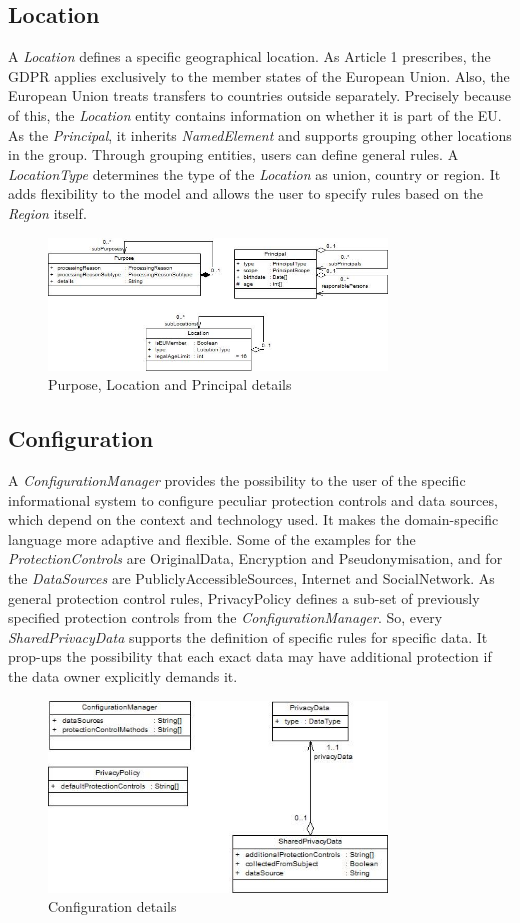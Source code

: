 \documentclass[11pt,english]{article}
\begin{document}
\subsection{Location}
A \emph{Location} defines a specific geographical location. As Article 1 prescribes, the GDPR applies exclusively to the member states of the European Union. Also, the European Union treats transfers to countries outside separately. Precisely because of this, the \emph{Location} entity contains information on whether it is part of the EU. As the \emph{Principal}, it inherits \emph{NamedElement} and supports grouping other locations in the group. Through grouping entities, users can define general rules. A \emph{LocationType} determines the type of the \emph{Location} as union, country or region. It adds flexibility to the model and allows the user to specify rules based on the  \emph{Region} itself.
\begin{figure}[H]
    \centering
    \includegraphics[width=9cm,scale=0.5]{images/purposeAndPrincipal.jpg}
    \caption{Purpose, Location and Principal details}
    \label{fig:purpose}
\end{figure}
\subsection{Configuration}
A \emph{ConfigurationManager} provides the possibility to the user of the specific informational system to configure peculiar protection controls and data sources, which depend on the context and technology used. It makes the domain-specific language more adaptive and flexible. Some of the examples for the \emph{ProtectionControls} are OriginalData, Encryption and Pseudonymisation, and for the \emph{DataSources} are PubliclyAccessibleSources, Internet and SocialNetwork. As general protection control rules, PrivacyPolicy defines a sub-set of previously specified protection controls from the \emph{ConfigurationManager}. So, every \emph{SharedPrivacyData} supports the definition of specific rules for specific data. It prop-ups the possibility that each exact data may have additional protection if the data owner explicitly demands it. 
\begin{figure}[H]
    \centering
    \includegraphics[width=9cm,scale=0.5]{images/configuration.jpg}
    \caption{Configuration details}
    \label{fig:configuration}
\end{figure}
\end{document}
